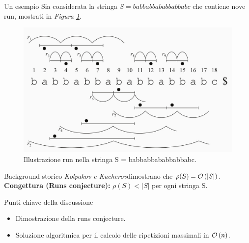 \documentclass{beamer}
\begin{document}
    \begin{frame}{Un esempio}
        Sia considerata la stringa \(S = babbabbababbabbabc\) che contiene nove 
        run, mostrati in \emph{Figura \ref{fig:1}}.

        \begin{figure}[!h]
            \centering
            \includegraphics[scale = .85]{../Extra/run example.jpg}
            \caption{Illustrazione run nella stringa S = babbabbababbabbabc.}
            \label{fig:1}
        \end{figure}
    \end{frame}

    \begin{frame}{Background storico}
        \emph{Kolpakov \emph{e} Kucherov}\footnotemark[1]
        dimostrano che \(\rho(S) = \mathcal{O} \left\lparen |S| \right\rparen\).
        \vskip 10pt
        \textbf{Congettura (Runs conjecture):} \(\rho (S) < |S|\) per ogni stringa S.

    \end{frame}

    \begin{frame}{Punti chiave della discussione}
        \begin{itemize}
            \item Dimostrazione della runs conjecture.
            \item Soluzione algoritmica per il calcolo delle ripetizioni 
                massimali in \(\mathcal{O} \left\lparen n \right\rparen\).
        \end{itemize}
    \end{frame}
    
\end{document}
